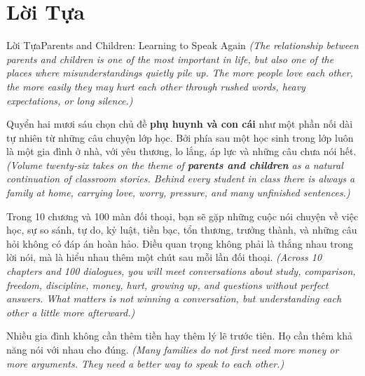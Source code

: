 \chapter*{Lời Tựa}

\begin{truyen}{Lời Tựa}{Parents and Children: Learning to Speak Again}
\textit{(The relationship between parents and children is one of the most important in life, but also one of the places where misunderstandings quietly pile up. The more people love each other, the more easily they may hurt each other through rushed words, heavy expectations, or long silence.)}

Quyển hai mươi sáu chọn chủ đề \textbf{phụ huynh và con cái} như một phần nối dài tự nhiên từ những câu chuyện lớp học. Bởi phía sau một học sinh trong lớp luôn là một gia đình ở nhà, với yêu thương, lo lắng, áp lực và những câu chưa nói hết.
\textit{(Volume twenty-six takes on the theme of \textbf{parents and children} as a natural continuation of classroom stories. Behind every student in class there is always a family at home, carrying love, worry, pressure, and many unfinished sentences.)}

Trong 10 chương và 100 màn đối thoại, bạn sẽ gặp những cuộc nói chuyện về việc học, sự so sánh, tự do, kỷ luật, tiền bạc, tổn thương, trưởng thành, và những câu hỏi không có đáp án hoàn hảo. Điều quan trọng không phải là thắng nhau trong lời nói, mà là hiểu nhau thêm một chút sau mỗi lần đối thoại.
\textit{(Across 10 chapters and 100 dialogues, you will meet conversations about study, comparison, freedom, discipline, money, hurt, growing up, and questions without perfect answers. What matters is not winning a conversation, but understanding each other a little more afterward.)}
\end{truyen}

\begin{baihoc}
Nhiều gia đình không cần thêm tiền hay thêm lý lẽ trước tiên. Họ cần thêm khả năng nói với nhau cho đúng.
\textit{(Many families do not first need more money or more arguments. They need a better way to speak to each other.)}
\end{baihoc}

